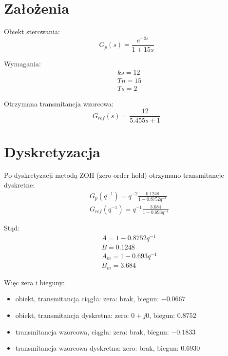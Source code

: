 \documentclass[fleqn]{article}
\newcommand \A {1 - 0.8752 q^{-1}}
\newcommand \B {0.1248}
\newcommand \Am {1 - 0.693 q^{-1}}
\newcommand \Bm {3.684}
\begin{document}
  
\section{Założenia}

Obiekt sterowania:
\begin{equation}\label{eq:Gp}
G_p(s) = \frac{e^{-2s}}{1 + 15s}
\end{equation}

Wymagania:
\begin{equation}\label{eq:wymagania}
\begin{split}
& ks = 12 \\
& Tn = 15 \\
& Ts = 2
\end{split}
\end{equation}

Otrzymana transmitancja wzorcowa:
\begin{equation}\label{eq:tr_ref}
G_{ref}(s) = \frac{12}{5.455s + 1}
\end{equation}

\section{Dyskretyzacja}
Po dyskretyzacji metodą ZOH (zero-order hold) otrzymano transmitancje dyskretne:
\begin{equation}\label{eq:G_d}
\begin{split}
& G_p(q^{-1}) = q^{-2}\frac{\B}{\A} \\
& G_{ref}(q^{-1}) = q^{-1}\frac{\Bm}{\Am}
\end{split}
\end{equation} %

Stąd:
\begin{equation}\label{eq:A_B_m}
\begin{split}
& A = \A \\
& B = \B \\
& A_m = \Am \\
& B_m = \Bm
\end{split}
\end{equation}

Więc zera i bieguny:
\begin{itemize}
	\item obiekt, transmitancja ciągła: zera: brak, biegun: $-0.0667$
	\item obiekt, transmitancja dyskretna: zero: $0+j0$, biegun: $0.8752$
	\item transmitancja wzorcowa, ciągła: zera: brak, biegun: $-0.1833$
	\item transmitancja wzorcowa dyskretna: zero: brak, biegun: $0.6930$
\end{itemize}
\end{document}
